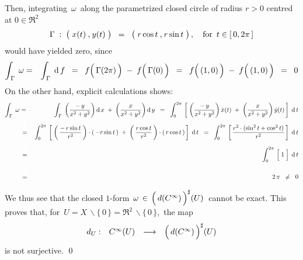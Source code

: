 \begin{enumerate}
\begin{equation*}
	\end{equation*}
	Then, integrating \,$\omega$\, along the parametrized closed circle of radius $r > 0$
	centred at $0 \in \Re^{2}$
	\begin{equation*}
	\Gamma
	\; : \;
		\left(\;x(t)\,\overset{{\color{white}1}}{,}\, y(t)\;\right)
	\;\; = \;\;
		\left(\;r \cos t \,\overset{{\color{white}1}}{,}\, r \sin t\;\right),
	\quad
	\textnormal{for \,$t \in [\,0,2\pi\,]$}
	\end{equation*}
	would have yielded zero, since
	\begin{eqnarray*}
	\displaystyle\int_{\,\Gamma}\;\omega
	& = &
		\displaystyle\int_{\,\Gamma}\;\d\,f
	\;\; = \;\;
		f\!\left(\,\overset{{\color{white}}}{\Gamma(2\pi)}\,\right)
		\; - \;
		f\!\left(\,\overset{{\color{white}}}{\Gamma(0)}\,\right)
	\;\; = \;\;
		f\!\left(\,\overset{{\color{white}}}{(1,0)}\,\right)
		\; - \;
		f\!\left(\,\overset{{\color{white}}}{(1,0)}\,\right)
	\;\; = \;\;
		0
	\end{eqnarray*}
	On the other hand, explicit calculations shows:
	\begin{eqnarray*}
	\displaystyle\int_{\,\Gamma}\;\omega
	& = &
		\displaystyle\int_{\,\Gamma}\;
			\left(\dfrac{-\,y}{x^{2}+y^{2}}\right)\d\,x
			\;+\;
			\left(\dfrac{x}{x^{2}+y^{2}}\right)\d\,y
	\;\; = \;\;
		\int_{0}^{2\pi}\,
			\left[\;
			\left(\dfrac{-\,y}{x^{2}+y^{2}}\right) \dot{x}(t)
			\; + \;
			\left(\dfrac{x}{x^{2}+y^{2}}\right) \dot{y}(t)
			\,\right]
			\;\d\,t
	\\
	& \overset{{\color{white}\textnormal{\Huge$1$}}}{=} &
		\int_{0}^{2\pi}\,
			\left[\;
			\left(\,\dfrac{-\,r\sin t}{r^{2}}\,\right) \cdot (\,-r \sin t\,)
			\; + \;
			\left(\,\dfrac{r \cos t}{r^{2}}\,\right) \cdot (\,r \cos t\,)
			\,\right]
			\;\d\,t
	\;\; = \;\;
		\int_{0}^{2\pi}\,
			\left[\, \dfrac{r^{2}\cdot(\sin^{2}t+\cos^{2}t)}{r^{2}} \,\right]
			\;\d\,t
	\\
	& \overset{{\color{white}\textnormal{\Huge$1$}}}{=} &
		\int_{0}^{2\pi}\,
			\left[\;\overset{{\color{white}.}}{1}\;\right]
			\;\d\,t
	\\
	& \overset{{\color{white}\textnormal{\Huge$1$}}}{=} &
		2\,\pi
	\;\; \neq \;\;
		0
	\end{eqnarray*}
	We thus see that the closed $1$-form
	\,$\omega \,\in\, \left(\,\overset{{\color{white}.}}{d(C^{\infty})}\,\right)^{\sharp}\!(U)$\,
	cannot be exact.
	This proves that, for \,$U = X \,\backslash \{\,0\,\} = \Re^{2} \,\backslash \{\,0\,\}$,\,
	the map
	\begin{equation*}
	\begin{array}{cccl}
	d_{U} : & C^{\infty}(U) & \longrightarrow & \left(\,\overset{{\color{white}.}}{d(C^{\infty})}\,\right)^{\sharp}\!(U)
	\end{array}
	\end{equation*}
	is not surjective.
	\qed
\end{enumerate}

